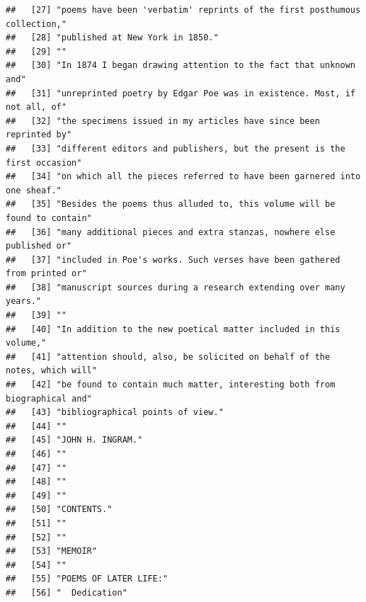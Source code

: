 \documentclass{article}\usepackage[]{graphicx}\usepackage[]{color}
\makeatletter
\newenvironment{kframe}{%
 \def\at@end@of@kframe{}%
 \ifinner\ifhmode%
  \def\at@end@of@kframe{\end{minipage}}%
  \begin{minipage}{\columnwidth}%
 \fi\fi%
 \def\FrameCommand##1{\hskip\@totalleftmargin \hskip-\fboxsep
 \colorbox{shadecolor}{##1}\hskip-\fboxsep
     \hskip-\linewidth \hskip-\@totalleftmargin \hskip\columnwidth}%
 \MakeFramed {\advance\hsize-\width
   \@totalleftmargin\z@ \linewidth\hsize
   \@setminipage}}%
 {\par\unskip\endMakeFramed%
 \at@end@of@kframe}
\newenvironment{knitrout}{}{} %
\makeatother
\begin{document}
\begin{knitrout}
\begin{kframe}
\begin{verbatim}
##   [27] "poems have been 'verbatim' reprints of the first posthumous collection,"     
##   [28] "published at New York in 1850."                                              
##   [29] ""                                                                            
##   [30] "In 1874 I began drawing attention to the fact that unknown and"              
##   [31] "unreprinted poetry by Edgar Poe was in existence. Most, if not all, of"      
##   [32] "the specimens issued in my articles have since been reprinted by"            
##   [33] "different editors and publishers, but the present is the first occasion"     
##   [34] "on which all the pieces referred to have been garnered into one sheaf."      
##   [35] "Besides the poems thus alluded to, this volume will be found to contain"     
##   [36] "many additional pieces and extra stanzas, nowhere else published or"         
##   [37] "included in Poe's works. Such verses have been gathered from printed or"     
##   [38] "manuscript sources during a research extending over many years."             
##   [39] ""                                                                            
##   [40] "In addition to the new poetical matter included in this volume,"             
##   [41] "attention should, also, be solicited on behalf of the notes, which will"     
##   [42] "be found to contain much matter, interesting both from biographical and"     
##   [43] "bibliographical points of view."                                             
##   [44] ""                                                                            
##   [45] "JOHN H. INGRAM."                                                             
##   [46] ""                                                                            
##   [47] ""                                                                            
##   [48] ""                                                                            
##   [49] ""                                                                            
##   [50] "CONTENTS."                                                                   
##   [51] ""                                                                            
##   [52] ""                                                                            
##   [53] "MEMOIR"                                                                      
##   [54] ""                                                                            
##   [55] "POEMS OF LATER LIFE:"                                                        
##   [56] "  Dedication"                                                                

\end{verbatim}
\end{kframe}
\end{knitrout}
\end{document}
